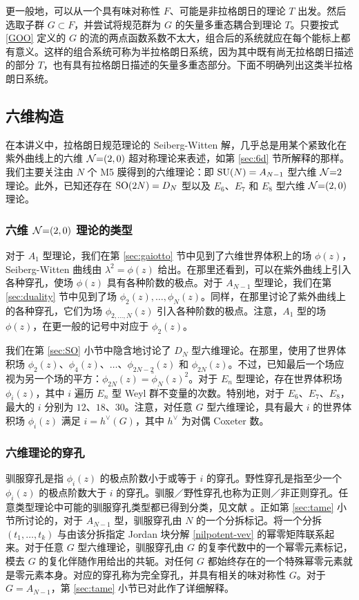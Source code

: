 更一般地，可以从一个具有味对称性 $F$、可能是非拉格朗日的理论 $T$ 出发。然后选取子群 $G\subset F$，并尝试将规范群为 $G$ 的矢量多重态耦合到理论 $T$。只要按式 \eqref{GOO} 定义的 $G$ 的流的两点函数系数不太大，组合后的系统就应在每个能标上都有意义。这样的组合系统可称为半拉格朗日系统，因为其中既有尚无拉格朗日描述的部分 $T$，也有具有拉格朗日描述的矢量多重态部分。下面不明确列出这类半拉格朗日系统。

\subsection{六维构造}\label{sec:app6d}
在本讲义中，拉格朗日规范理论的 Seiberg-Witten 解，几乎总是用某个紧致化在紫外曲线上的六维 $\mathcal{N}{=}(2,0)$ 超对称理论来表述，如第 \ref{sec:6d} 节所解释的那样。我们主要关注由 $N$ 个 M5 膜得到的六维理论：即 $\mathop{\mathrm{SU}}(N)=A_{N-1}$ 型六维 $\mathcal{N}{=}2$ 理论。此外，已知还存在 $\mathop{\mathrm{SO}}(2N)=D_N$ 型以及 $E_6$、$E_7$ 和 $E_8$ 型六维 $\mathcal{N}{=}(2,0)$ 理论。

\subsubsection{六维 $\mathcal{N}{=}(2,0)$ 理论的类型}
对于 $A_1$ 型理论，我们在第 \ref{sec:gaiotto} 节中见到了六维世界体积上的场 $\phi(z)$，Seiberg-Witten 曲线由 $\lambda^2=\phi(z)$ 给出。在那里还看到，可以在紫外曲线上引入各种穿孔，使场 $\phi(z)$ 具有各种阶数的极点。对于 $A_{N-1}$ 型理论，我们在第 \ref{sec:duality} 节中见到了场 $\phi_2(z),\ldots,\phi_N(z)$。同样，在那里讨论了紫外曲线上的各种穿孔，它们为场 $\phi_{2,\ldots,N}(z)$ 引入各种阶数的极点。注意，$A_1$ 型的场 $\phi(z)$，在更一般的记号中对应于 $\phi_2(z)$。

我们在第 \ref{sec:SO} 小节中隐含地讨论了 $D_N$ 型六维理论。在那里，使用了世界体积场 $\phi_2(z)$、$\phi_4(z)$、$\ldots$、$\phi_{2N-2}(z)$ 和 $\phi_{2N}(z)$。不过，已知最后一个场应视为另一个场的平方：$\phi_{2N}(z)=\tilde\phi_N(z)^2$。对于 $E_n$ 型理论，存在世界体积场 $\phi_i(z)$，其中 $i$ 遍历 $E_n$ 型 Weyl 群不变量的次数。特别地，对于 $E_6$、$E_7$、$E_8$，最大的 $i$ 分别为 $12$、$18$、$30$。注意，对任意 $G$ 型六维理论，具有最大 $i$ 的世界体积场 $\phi_i(z)$ 满足 $i=h^\vee(G)$，其中 $h^\vee$ 为对偶 Coxeter 数。

\subsubsection{六维理论的穿孔}
驯服穿孔是指 $\phi_i(z)$ 的极点阶数小于或等于 $i$ 的穿孔。野性穿孔是指至少一个 $\phi_i(z)$ 的极点阶数大于 $i$ 的穿孔。驯服／野性穿孔也称为正则／非正则穿孔。任意类型理论中可能的驯服穿孔类型都已得到分类，见文献 \cite{Chacaltana:2012zy}。正如第 \ref{sec:tame} 小节所讨论的，对于 $A_{N-1}$ 型，驯服穿孔由 $N$ 的一个分拆标记。将一个分拆 $(t_1,\ldots,t_k)$ 与由该分拆指定 Jordan 块分解 \eqref{nilpotent-vev} 的幂零矩阵联系起来。对于任意 $G$ 型六维理论，驯服穿孔由 $G$ 的复李代数中的一个幂零元素标记，模去 $G$ 的复化伴随作用给出的共轭。对任何 $G$ 都始终存在的一个特殊幂零元素就是零元素本身。对应的穿孔称为完全穿孔，并具有相关的味对称性 $G$。对于 $G=A_{N-1}$，第 \ref{sec:tame} 小节已对此作了详细解释。

